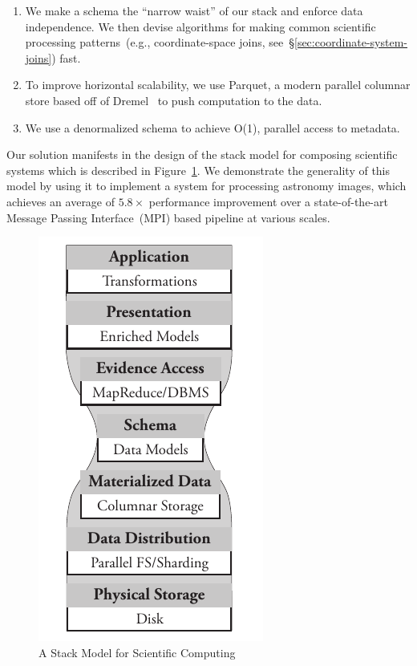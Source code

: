 \documentclass{acm_proc_article-sp}
\begin{document}
\begin{enumerate}
\item We make a schema the ``narrow waist'' of our stack and enforce data independence. We then
devise algorithms for making common scientific processing patterns~(e.g., coordinate-space joins,
see~\S\ref{sec:coordinate-system-joins}) fast.
\item To improve horizontal scalability, we use Parquet, a modern parallel columnar store based off of
Dremel~\cite{melnik10} to push computation to the data.
\item We use a denormalized schema to achieve O(1), parallel access to metadata.
\end{enumerate}

Our solution manifests in the design of the stack model for composing scientific systems which is
described in Figure~\ref{fig:stack-model}. We demonstrate the generality of this model by using it to
implement a system for processing astronomy images, which achieves an average of $5.8\times$ performance
improvement over a state-of-the-art Message Passing Interface~(MPI) based pipeline at various scales.

\begin{figure}[h]
\begin{center}
\includegraphics[width=0.6\linewidth]{stack-model.pdf}
\end{center}
\caption{A Stack Model for Scientific Computing}
\label{fig:stack-model}
\end{figure}
\end{document}
